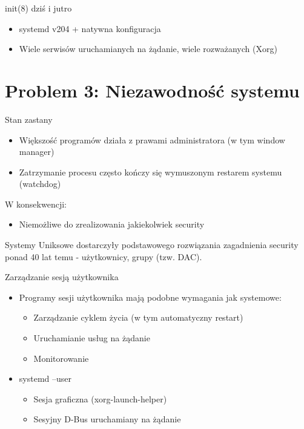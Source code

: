 \documentclass[presentation,aspectratio=43,12pt]{beamer}
\begin{document}
\begin{frame}[label=sec-4-8]{init(8) dziś i jutro}
\begin{itemize}
\item systemd v204 + natywna konfiguracja

\item Wiele serwisów uruchamianych na żądanie, wiele rozważanych (Xorg)
\end{itemize}


\end{frame}

\section{Problem 3: Niezawodność systemu}
\label{sec-5}

\begin{frame}[label=sec-5-1]{Stan zastany}
\begin{itemize}
\item Większość programów działa z prawami administratora (w tym
window manager)

\item Zatrzymanie procesu często kończy się wymuszonym restarem
systemu (watchdog)
\end{itemize}

\pause
W konsekwencji:
\begin{itemize}
\item Niemożliwe do zrealizowania jakiekolwiek security
\end{itemize}

\pause
Systemy Uniksowe dostarczyły podstawowego rozwiązania zagadnienia
security ponad 40 lat temu - użytkownicy, grupy (tzw. DAC).
\end{frame}

\begin{frame}[label=sec-5-2]{Zarządzanie sesją użytkownika}
\begin{itemize}
\item Programy sesji użytkownika mają podobne wymagania jak systemowe:
\begin{itemize}
\item Zarządzanie cyklem życia (w tym automatyczny restart)
\item Uruchamianie usług na żądanie
\item Monitorowanie
\end{itemize}

\item <2-> systemd --user
\begin{itemize}
\item Sesja graficzna (xorg-launch-helper)
\item Sesyjny D-Bus uruchamiany na żądanie
\end{itemize}
\end{itemize}
\end{frame}
\end{document}
